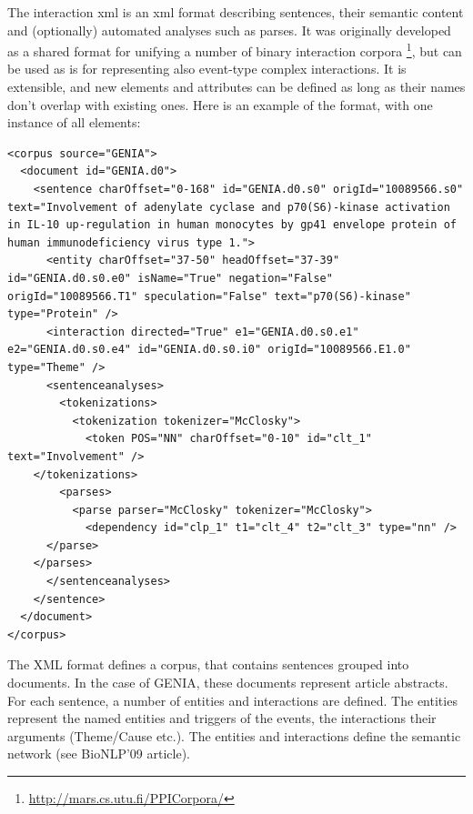 \documentclass[a4paper,12pt]{article}
\begin{document}
The interaction xml is an xml format describing sentences, their semantic content
and (optionally) automated analyses such as parses. It was originally
developed as a shared format for unifying a number of binary interaction corpora
\footnote{\url{http://mars.cs.utu.fi/PPICorpora/}}, but can be used as is for
representing also event-type complex interactions. It is extensible, and new
elements and attributes can be defined as long as their names don't overlap with existing
ones. Here is an example of the format, with one instance of all elements:


\begin{lstlisting}
<corpus source="GENIA">
  <document id="GENIA.d0">
    <sentence charOffset="0-168" id="GENIA.d0.s0" origId="10089566.s0" text="Involvement of adenylate cyclase and p70(S6)-kinase activation in IL-10 up-regulation in human monocytes by gp41 envelope protein of human immunodeficiency virus type 1.">
      <entity charOffset="37-50" headOffset="37-39" id="GENIA.d0.s0.e0" isName="True" negation="False" origId="10089566.T1" speculation="False" text="p70(S6)-kinase" type="Protein" />
      <interaction directed="True" e1="GENIA.d0.s0.e1" e2="GENIA.d0.s0.e4" id="GENIA.d0.s0.i0" origId="10089566.E1.0" type="Theme" />
      <sentenceanalyses>
        <tokenizations>
          <tokenization tokenizer="McClosky">
            <token POS="NN" charOffset="0-10" id="clt_1" text="Involvement" />
 	</tokenizations>
        <parses>
          <parse parser="McClosky" tokenizer="McClosky">
            <dependency id="clp_1" t1="clt_4" t2="clt_3" type="nn" />
	  </parse>
	</parses>
      </sentenceanalyses>
    </sentence>
  </document>
</corpus>
\end{lstlisting}

The XML format defines a corpus, that contains sentences grouped into documents.
In the case of GENIA, these documents represent article abstracts. For each
sentence, a number of entities and interactions are defined. The entities
represent the named entities and triggers of the events, the interactions their
arguments (Theme/Cause etc.). The entities and interactions define the semantic
network (see BioNLP'09 article).
\end{document}
